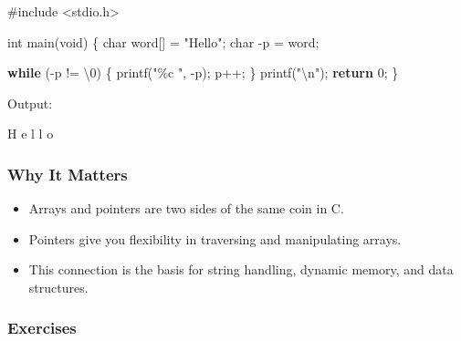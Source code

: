 \documentclass[
  letterpaper,
  DIV=11,
  numbers=noendperiod]{scrreprt}
\newenvironment{Shaded}{\begin{snugshade}}{\end{snugshade}}
\newcommand{\CharTok}[1]{\textcolor[rgb]{0.13,0.47,0.30}{#1}}
\newcommand{\ControlFlowTok}[1]{\textcolor[rgb]{0.00,0.23,0.31}{\textbf{#1}}}
\newcommand{\DataTypeTok}[1]{\textcolor[rgb]{0.68,0.00,0.00}{#1}}
\newcommand{\DecValTok}[1]{\textcolor[rgb]{0.68,0.00,0.00}{#1}}
\newcommand{\ExtensionTok}[1]{\textcolor[rgb]{0.00,0.23,0.31}{#1}}
\newcommand{\ImportTok}[1]{\textcolor[rgb]{0.00,0.46,0.62}{#1}}
\newcommand{\NormalTok}[1]{\textcolor[rgb]{0.00,0.23,0.31}{#1}}
\newcommand{\OperatorTok}[1]{\textcolor[rgb]{0.37,0.37,0.37}{#1}}
\newcommand{\PreprocessorTok}[1]{\textcolor[rgb]{0.68,0.00,0.00}{#1}}
\newcommand{\SpecialCharTok}[1]{\textcolor[rgb]{0.37,0.37,0.37}{#1}}
\newcommand{\StringTok}[1]{\textcolor[rgb]{0.13,0.47,0.30}{#1}}
\providecommand{\tightlist}{%
  \setlength{\itemsep}{0pt}\setlength{\parskip}{0pt}}
\begin{document}
\begin{Shaded}
\begin{Highlighting}[]
\PreprocessorTok{\#include }\ImportTok{\textless{}stdio.h\textgreater{}}

\DataTypeTok{int}\NormalTok{ main}\OperatorTok{(}\DataTypeTok{void}\OperatorTok{)} \OperatorTok{\{}
    \DataTypeTok{char}\NormalTok{ word}\OperatorTok{[]} \OperatorTok{=} \StringTok{"Hello"}\OperatorTok{;}
    \DataTypeTok{char} \OperatorTok{{-}}\NormalTok{p }\OperatorTok{=}\NormalTok{ word}\OperatorTok{;}

    \ControlFlowTok{while} \OperatorTok{({-}}\NormalTok{p }\OperatorTok{!=} \CharTok{\textquotesingle{}}\SpecialCharTok{\textbackslash{}0}\CharTok{\textquotesingle{}}\OperatorTok{)} \OperatorTok{\{}
\NormalTok{        printf}\OperatorTok{(}\StringTok{"}\SpecialCharTok{\%c}\StringTok{ "}\OperatorTok{,} \OperatorTok{{-}}\NormalTok{p}\OperatorTok{);}
\NormalTok{        p}\OperatorTok{++;}
    \OperatorTok{\}}
\NormalTok{    printf}\OperatorTok{(}\StringTok{"}\SpecialCharTok{\textbackslash{}n}\StringTok{"}\OperatorTok{);}
    \ControlFlowTok{return} \DecValTok{0}\OperatorTok{;}
\OperatorTok{\}}
\end{Highlighting}
\end{Shaded}

Output:

\begin{Shaded}
\begin{Highlighting}[]
\ExtensionTok{H}\NormalTok{ e l l o}
\end{Highlighting}
\end{Shaded}

\subsubsection{Why It Matters}\label{why-it-matters-31}

\begin{itemize}
\tightlist
\item
  Arrays and pointers are two sides of the same coin in C.
\item
  Pointers give you flexibility in traversing and manipulating arrays.
\item
  This connection is the basis for string handling, dynamic memory, and
  data structures.
\end{itemize}

\subsubsection{Exercises}\label{exercises-32}
\end{document}
